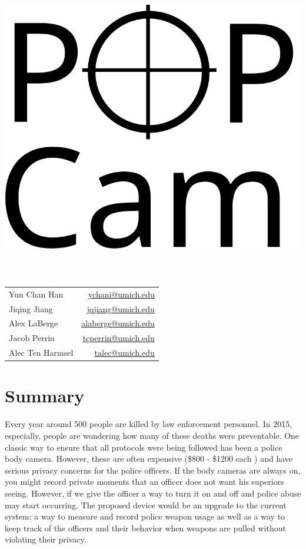 \documentclass[12pt]{article}
\begin{document}
\title{\includegraphics[height=0.3\textheight]{logo}}
\date{}
\maketitle

\vfill

\begin{center}
    \begin{tabular}{lr}
        Yun Chan Han & \url{ychani@umich.edu}\\
        Jiqing Jiang & \url{jqjiang@umich.edu}\\
        Alex LaBerge & \url{alaberge@umich.edu}\\
        Jacob Perrin & \url{tcperrin@umich.edu}\\
        Alec Ten Harmsel & \url{talec@umich.edu}\\
    \end{tabular}
\end{center}

\newpage

\tableofcontents

\newpage

\section{Summary}
Every year around 500 people are killed by law enforcement personnel. In 2015,
especially, people are wondering how many of these deaths were preventable. One
classic way to ensure that all protocols were being followed has been a police
body camera. However, these are often expensive (\$800 - \$1200 each
\cite{cam}) and have serious privacy concerns for the police officers. If the
body cameras are always on, you might record private moments that an officer
does not want his superiors seeing. However, if we give the officer a way to
turn it on and off and police abuse may start occurring. The proposed device
would be an upgrade to the current system: a way to measure and record police
weapon usage as well as a way to keep track of the officers and their behavior
when weapons are pulled without violating their privacy.
\end{document}
